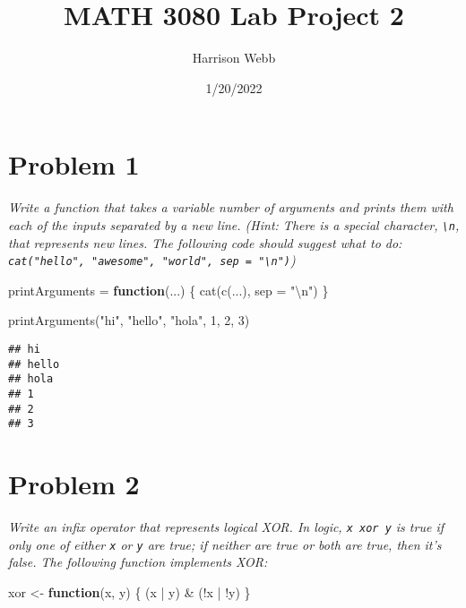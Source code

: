 \documentclass[
]{article}
\title{MATH 3080 Lab Project 2}
\author{Harrison Webb}
\date{1/20/2022}
\newenvironment{Shaded}{\begin{snugshade}}{\end{snugshade}}
\newcommand{\AttributeTok}[1]{\textcolor[rgb]{0.77,0.63,0.00}{#1}}
\newcommand{\ControlFlowTok}[1]{\textcolor[rgb]{0.13,0.29,0.53}{\textbf{#1}}}
\newcommand{\DecValTok}[1]{\textcolor[rgb]{0.00,0.00,0.81}{#1}}
\newcommand{\FunctionTok}[1]{\textcolor[rgb]{0.00,0.00,0.00}{#1}}
\newcommand{\NormalTok}[1]{#1}
\newcommand{\OtherTok}[1]{\textcolor[rgb]{0.56,0.35,0.01}{#1}}
\newcommand{\SpecialCharTok}[1]{\textcolor[rgb]{0.00,0.00,0.00}{#1}}
\newcommand{\StringTok}[1]{\textcolor[rgb]{0.31,0.60,0.02}{#1}}
\begin{document}
\maketitle

{
\setcounter{tocdepth}{2}
\tableofcontents
}
\hypertarget{problem-1}{%
\section{Problem 1}\label{problem-1}}

\emph{Write a function that takes a variable number of arguments and
prints them with each of the inputs separated by a new line. (Hint:
There is a special character, \texttt{\textbackslash{}n}, that
represents new lines. The following code should suggest what to do:
\texttt{cat("hello",\ "awesome",\ "world",\ sep\ =\ "\textbackslash{}n")})}

\begin{Shaded}
\begin{Highlighting}[]
\NormalTok{printArguments }\OtherTok{=} \ControlFlowTok{function}\NormalTok{(...) \{}
  \FunctionTok{cat}\NormalTok{(}\FunctionTok{c}\NormalTok{(...), }\AttributeTok{sep =} \StringTok{"}\SpecialCharTok{\textbackslash{}n}\StringTok{"}\NormalTok{)}
\NormalTok{\}}

\FunctionTok{printArguments}\NormalTok{(}\StringTok{"hi"}\NormalTok{, }\StringTok{"hello"}\NormalTok{, }\StringTok{"hola"}\NormalTok{, }\DecValTok{1}\NormalTok{, }\DecValTok{2}\NormalTok{, }\DecValTok{3}\NormalTok{)}
\end{Highlighting}
\end{Shaded}

\begin{verbatim}
## hi
## hello
## hola
## 1
## 2
## 3
\end{verbatim}

\hypertarget{problem-2}{%
\section{Problem 2}\label{problem-2}}

\emph{Write an infix operator that represents logical XOR. In logic,
\texttt{x\ xor\ y} is true if only one of either \texttt{x} or
\texttt{y} are true; if neither are true or both are true, then it's
false. The following function implements XOR:}

\begin{Shaded}
\begin{Highlighting}[]
\NormalTok{xor }\OtherTok{\textless{}{-}} \ControlFlowTok{function}\NormalTok{(x, y) \{}
\NormalTok{  (x }\SpecialCharTok{|}\NormalTok{ y) }\SpecialCharTok{\&}\NormalTok{ (}\SpecialCharTok{!}\NormalTok{x }\SpecialCharTok{|} \SpecialCharTok{!}\NormalTok{y)}
\NormalTok{\}}
\end{Highlighting}
\end{Shaded}
\end{document}

